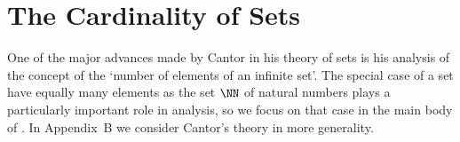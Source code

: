         \section{The Cardinality of Sets}
                        \label{SectA15}

        One of the major advances made by Cantor in his theory of sets is his analysis of the concept of the `number of elements of an infinite set'.
    The special case of a set have equally many elements as the set ${\NN}$ of natural numbers plays a particularly important role in analysis,
    so we focus on that case in the main body of {\ThisText}. In Appendix~B we consider Cantor's theory in more generality.



\V

